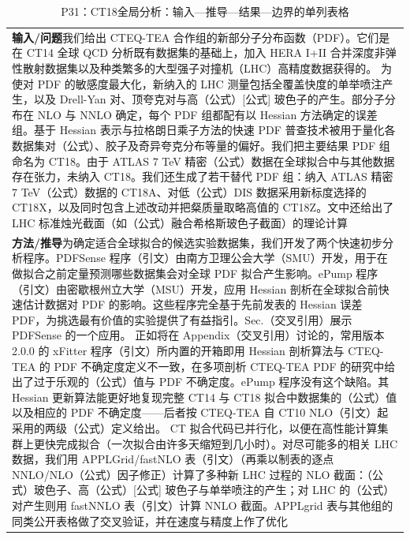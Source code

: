 \documentclass[UTF8,11pt,oneside]{ctexbook}
\begin{document}
\begin{table}[htbp]
  \centering
  \caption*{P31：CT18全局分析：输入—推导—结果—边界的单列表格}
  \small
  \begin{tabular}{@{}p{}@{}}
    \toprule
    \textbf{输入/问题}\quad 我们给出 CTEQ-TEA 合作组的新部分子分布函数（PDF）。它们是在 CT14 全球 QCD 分析既有数据集的基础上，加入 HERA I+II 合并深度非弹性散射数据集以及种类繁多的大型强子对撞机（LHC）高精度数据获得的。 为使对 PDF 的敏感度最大化，新纳入的 LHC 测量包括全覆盖快度的单举喷注产生，以及 Drell-Yan 对、顶夸克对与高（公式）[公式] 玻色子的产生。部分子分布在 NLO 与 NNLO 确定，每个 PDF 组都配有以 Hessian 方法确定的误差组。基于 Hessian 表示与拉格朗日乘子方法的快速 PDF 普查技术被用于量化各数据集对（公式）、胶子及奇异夸克分布等量的偏好。我们把主要结果 PDF 组命名为 CT18。由于 ATLAS 7 TeV 精密（公式）数据在全球拟合中与其他数据存在张力，未纳入 CT18。我们还生成了若干替代 PDF 组：纳入 ATLAS 精密 7 TeV（公式）数据的 CT18A、对低（公式）DIS 数据采用新标度选择的 CT18X，以及同时包含上述改动并把粲质量取略高值的 CT18Z。文中还给出了 LHC 标准烛光截面（如（公式）融合希格斯玻色子截面）的理论计算 \\
    \textbf{方法/推导}\quad 为确定适合全球拟合的候选实验数据集，我们开发了两个快速初步分析程序。PDFSense 程序（引文）由南方卫理公会大学（SMU）开发，用于在做拟合之前定量预测哪些数据集会对全球 PDF 拟合产生影响。ePump 程序（引文）由密歇根州立大学（MSU）开发，应用 Hessian 剖析在全球拟合前快速估计数据对 PDF 的影响。这些程序完全基于先前发表的 Hessian 误差 PDF，为挑选最有价值的实验提供了有益指引。Sec.（交叉引用）展示 PDFSense 的一个应用。 正如将在 Appendix（交叉引用）讨论的，常用版本 2.0.0 的 xFitter 程序（引文）所内置的开箱即用 Hessian 剖析算法与 CTEQ-TEA 的 PDF 不确定度定义不一致，在多项剖析 CTEQ-TEA PDF 的研究中给出了过于乐观的（公式）值与 PDF 不确定度。ePump 程序没有这个缺陷。其 Hessian 更新算法能更好地复现完整 CT14 与 CT18 拟合中数据集的（公式）值以及相应的 PDF 不确定度——后者按 CTEQ-TEA 自 CT10 NLO（引文）起采用的两级（公式）定义给出。 CT 拟合代码已并行化，以便在高性能计算集群上更快完成拟合（一次拟合由许多天缩短到几小时）。对尽可能多的相关 LHC 数据，我们用 APPLGrid/fastNLO 表（引文）（再乘以制表的逐点 NNLO/NLO（公式）因子修正）计算了多种新 LHC 过程的 NLO 截面：（公式）玻色子、高（公式）[公式] 玻色子与单举喷注的产生；对 LHC 的（公式）对产生则用 fastNNLO 表（引文）计算 NNLO 截面。APPLgrid 表与其他组的同类公开表格做了交叉验证，并在速度与精度上作了优化 \\

\end{tabular}
\end{table}
\end{document}
